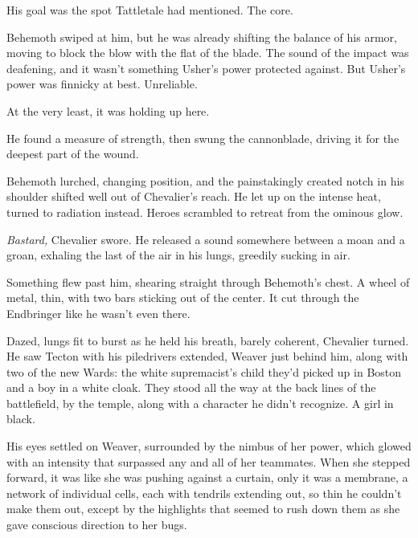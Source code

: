 His goal was the spot Tattletale had mentioned.  The core.



Behemoth swiped at him, but he was already shifting the balance of his armor, moving to block the blow with the flat of the blade.  The sound of the impact was deafening, and it wasn't something Usher's power protected against.  But Usher's power was finnicky at best.  Unreliable.



At the very least, it was holding up here.



He found a measure of strength, then swung the cannonblade, driving it for the deepest part of the wound.



Behemoth lurched, changing position, and the painstakingly created notch in his shoulder shifted well out of Chevalier's reach.  He let up on the intense heat, turned to radiation instead.  Heroes scrambled to retreat from the ominous glow.



\emph{Bastard, }Chevalier swore.  He released a sound somewhere between a moan and a groan, exhaling the last of the air in his lungs, greedily sucking in air.



Something flew past him, shearing straight through Behemoth's chest.  A wheel of metal, thin, with two bars sticking out of the center.  It cut through the Endbringer like he wasn't even there.



Dazed, lungs fit to burst as he held his breath, barely coherent, Chevalier turned.  He saw Tecton with his piledrivers extended, Weaver just behind him, along with two of the new Wards: the white supremacist's child they'd picked up in Boston and a boy in a white cloak.  They stood all the way at the back lines of the battlefield, by the temple, along with a character he didn't recognize.  A girl in black.



His eyes settled on Weaver, surrounded by the nimbus of her power, which glowed with an intensity that surpassed any and all of her teammates.  When she stepped forward, it was like she was pushing against a curtain, only it was a membrane, a network of individual cells, each with tendrils extending out, so thin he couldn't make them out, except by the highlights that seemed to rush down them as she gave conscious direction to her bugs.



